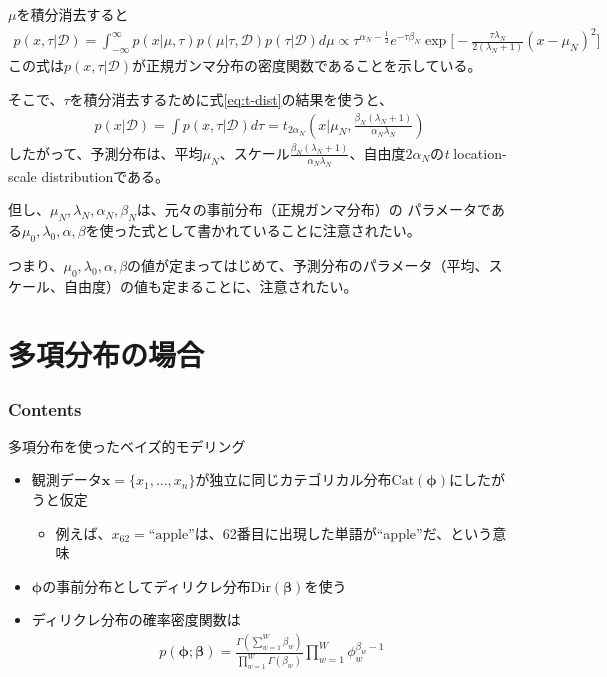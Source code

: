 \documentclass[aspectratio=169,unicode,dvipdfmx,14pt]{beamer}
\begin{document}
\begin{frame}
\FontMath
$\mu$を積分消去すると
\begin{align}
p(x, \tau|\mathcal{D})
= \int_{-\infty}^\infty p(x|\mu,\tau) p(\mu|\tau,\mathcal{D})p(\tau|\mathcal{D}) d\mu
\propto
\tau^{\alpha_N - \frac{1}{2}}
e^{ - \tau \beta_N } \exp\bigg[ - \frac{ \tau \lambda_N }{2(\lambda_N + 1)} (x - \mu_N)^2 \bigg]
\end{align}
この式は$p(x, \tau|\mathcal{D})$が正規ガンマ分布の密度関数であることを示している。

そこで、$\tau$を積分消去するために式\eqref{eq:t-dist}の結果を使うと、
\begin{align}
p(x|\mathcal{D}) = \int p(x, \tau|\mathcal{D}) d\tau
= t_{2\alpha_N} ( x | \mu_N, \frac{\beta_N(\lambda_N + 1)}{\alpha_N\lambda_N} ) 
\end{align}
したがって、予測分布は、平均$\mu_N$、スケール$\frac{\beta_N(\lambda_N + 1)}{\alpha_N\lambda_N}$、自由度$2\alpha_N$の\textit{t} location-scale distributionである。

但し、$\mu_N, \lambda_N, \alpha_N,\beta_N$は、元々の事前分布（正規ガンマ分布）の
パラメータである$\mu_0, \lambda_0, \alpha, \beta$を使った式として書かれていることに注意されたい。

つまり、$\mu_0, \lambda_0, \alpha, \beta$の値が定まってはじめて、予測分布のパラメータ（平均、スケール、自由度）の値も定まることに、注意されたい。
\end{frame}

\section{多項分布の場合}

\begin{frame}\frametitle{Contents}
\Large \tableofcontents[currentsection]
\end{frame}

\begin{frame}{多項分布を使ったベイズ的モデリング}
\begin{itemize}
\item 観測データ$\bm{x}=\{x_1,\ldots,x_n\}$が独立に同じカテゴリカル分布$\mbox{Cat}(\bm{\phi})$にしたがうと仮定
\begin{itemize}
\item 例えば、$x_{62} = \mbox{``apple''}$は、62番目に出現した単語が``apple''だ、という意味
\end{itemize}
\item $\bm{\phi}$の事前分布としてディリクレ分布$\mbox{Dir}(\bm{\beta})$を使う
\item ディリクレ分布の確率密度関数は
\begin{align}
p(\bm{\phi}; \bm{\beta}) = \frac{\Gamma(\sum_{w=1}^W \beta_w)}{\prod_{w=1}^W \Gamma(\beta_w)}
\prod_{w=1}^W \phi_w^{\beta_w - 1}
\end{align}
\end{itemize}
\end{frame}
\end{document}
